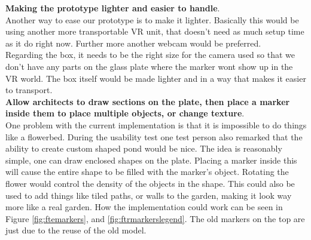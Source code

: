 \textbf{Making the prototype lighter and easier to handle}.\\
Another way to ease our prototype is to make it lighter. Basically this would be using another more transportable VR unit, that doesn't need as much setup time as it do right now. Further more another webcam would be preferred.\\
Regarding the box, it needs to be the right size for the camera used so that we don't have any parts on the glass plate where the marker wont show up in the VR world. The box itself would be made lighter and in a way that makes it easier to transport.\\

\textbf{Allow architects to draw sections on the plate, then place a marker inside them to place multiple objects, or change texture}.\\ One problem with the current implementation is that it is impossible to do things like a flowerbed. During the usability test one test person also remarked that the ability to create custom shaped pond would be nice. The idea is reasonably simple, one can draw enclosed shapes on the plate. Placing a marker inside this will cause the entire shape to be filled with the marker's object. Rotating the flower would control the density of the objects in the shape. This could also be used to add things like tiled paths, or walls to the garden, making it look way more like a real garden. How the implementation could work can be seen in Figure \ref{fig:ftemarkers}, and \ref{fig:ftrmarkerslegend}. The old markers on the top are just due to the reuse of the old model.
